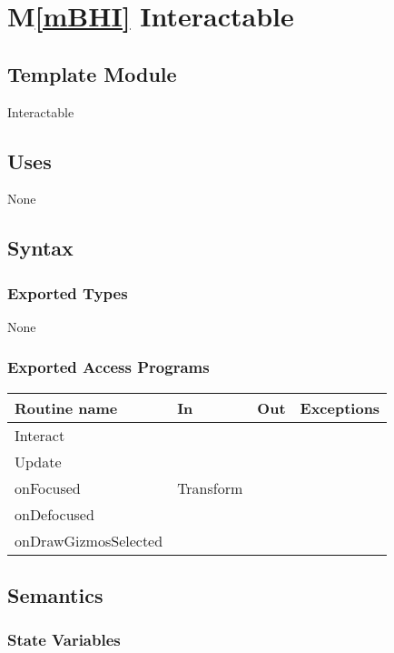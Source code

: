 \documentclass[12pt]{article}
\newcommand{\mref}[1]{M\ref{#1}}
\begin{document}
\newpage

\section* {\mref{mBHI} Interactable}

\subsection*{Template Module}

Interactable

\subsection* {Uses}

None

\subsection* {Syntax}

\subsubsection* {Exported Types}

None

\subsubsection* {Exported Access Programs}

\begin{tabular}{| l | l | l | l |}
\hline
\textbf{Routine name} & \textbf{In} & \textbf{Out} & \textbf{Exceptions}\\
\hline
Interact & ~ & ~  & ~\\
Update & ~ & ~ & ~\\
onFocused & Transform & ~  & ~\\
onDefocused & ~ & ~  & ~\\
onDrawGizmosSelected & ~ & ~  & ~\\
\hline
\end{tabular}

\subsection* {Semantics}

\subsubsection* {State Variables}
\end{document}
